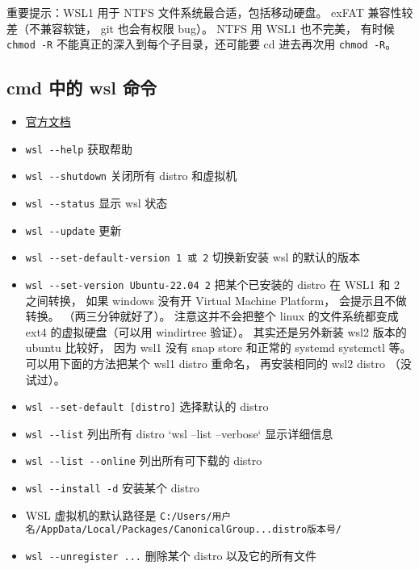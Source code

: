 
\begin{issues}
\issueDraft
\end{issues}

重要提示：WSL1 用于 NTFS 文件系统最合适，包括移动硬盘。 exFAT 兼容性较差（不兼容软链， git 也会有权限 bug）。 NTFS 用 WSL1 也不完美， 有时候 \verb|chmod -R| 不能真正的深入到每个子目录，还可能要 cd 进去再次用 \verb|chmod -R|。

\subsection{cmd 中的 wsl 命令}
\begin{itemize}
\item \href{https://docs.microsoft.com/en-us/windows/wsl/}{官方文档}
\item \verb`wsl --help` 获取帮助
\item \verb`wsl --shutdown` 关闭所有 distro 和虚拟机
\item \verb`wsl --status` 显示 wsl 状态
\item \verb`wsl --update` 更新
\item \verb`wsl --set-default-version 1 或 2` 切换新安装 wsl 的默认的版本
\item \verb`wsl --set-version Ubuntu-22.04 2` 把某个已安装的 distro 在 WSL1 和 2 之间转换， 如果 windows 没有开 Virtual Machine Platform， 会提示且不做转换。 （两三分钟就好了）。 注意这并不会把整个 linux 的文件系统都变成 ext4 的虚拟硬盘（可以用 windirtree 验证）。 其实还是另外新装 wsl2 版本的 ubuntu 比较好， 因为 wsl1 没有 snap store 和正常的 systemd systemctl 等。 可以用下面的方法把某个 wsl1 distro 重命名， 再安装相同的 wsl2 distro （没试过）。
\item \verb`wsl --set-default [distro]` 选择默认的 distro
\item \verb`wsl --list` 列出所有 distro `wsl --list --verbose` 显示详细信息
\item \verb`wsl --list --online` 列出所有可下载的 distro
\item \verb`wsl --install -d` 安装某个 distro
\item WSL 虚拟机的默认路径是 \verb`C:/Users/用户名/AppData/Local/Packages/CanonicalGroup...distro版本号/`
\item \verb`wsl --unregister ...` 删除某个 distro 以及它的所有文件


\end{itemize}
